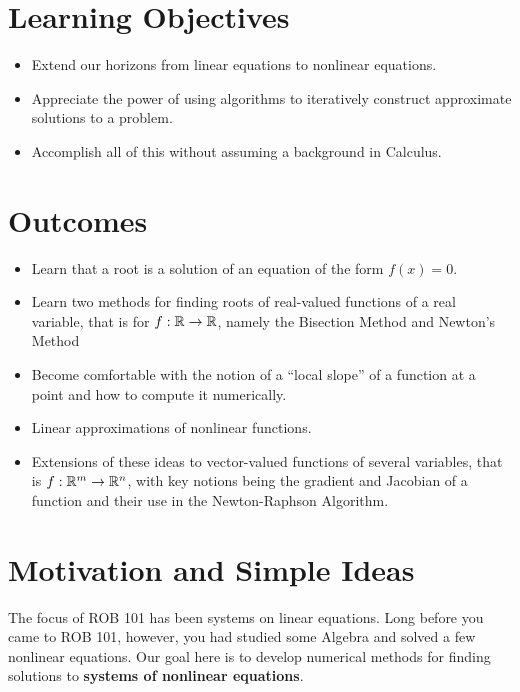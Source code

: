 \section*{Learning Objectives}
\begin{itemize}
\item Extend our horizons from linear equations to nonlinear equations. 
\item Appreciate the power of using algorithms to iteratively construct approximate solutions to a problem.
\item Accomplish all of this without assuming a background in Calculus.
\end{itemize}

\section*{Outcomes}
\begin{itemize}
\item Learn that a root is a solution of an equation of the form $f(x)=0$.
\item Learn two methods for finding roots of real-valued functions of a real variable, that is for $f:\mathbb R \to \mathbb R$, namely the Bisection Method and Newton's Method
\item Become comfortable with the notion of a ``local slope'' of a function at a point and how to compute it numerically.
\item Linear approximations of nonlinear functions.
\item Extensions of these ideas to vector-valued functions of several variables, that is $f:\mathbb R^m \to \mathbb R^n$, with key notions being the gradient and Jacobian of a function and their use in the Newton-Raphson Algorithm.
\end{itemize}


\vspace*{1.5cm}





\newpage

\section{Motivation and Simple Ideas}

The focus of ROB 101 has been systems on linear equations. Long before you came to ROB 101, however, you had studied some Algebra and solved a few nonlinear equations. Our goal here is to develop numerical methods for finding solutions to \textbf{systems of nonlinear equations}. \\

